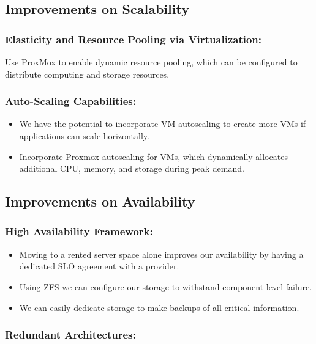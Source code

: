 \documentclass{llncs}
\begin{document}
\subsection{Improvements on Scalability}

\subsubsection{Elasticity and Resource Pooling via Virtualization:}
Use ProxMox to enable dynamic resource pooling, which can be configured to distribute computing and storage resources.


\subsubsection{Auto-Scaling Capabilities:}

\begin{itemize}
  \item We have the potential to incorporate VM autoscaling to create more VMs if applications can scale horizontally.
  \item Incorporate Proxmox autoscaling for VMs, which dynamically allocates additional CPU, memory, and storage during peak demand.
\end{itemize}


\subsection{Improvements on Availability}

\subsubsection{High Availability Framework:}

\begin{itemize}
  \item Moving to a rented server space alone improves our availability by having a dedicated SLO agreement with a provider.
  \item Using ZFS we can configure our storage to withstand component level failure.
  \item We can easily dedicate storage to make backups of all critical information.
\end{itemize}

\subsubsection{Redundant Architectures:}
\end{document}
